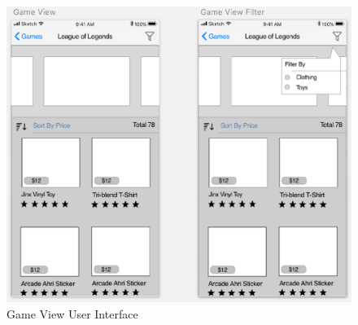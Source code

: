 \documentclass[onecolumn, draftclsnofoot,10pt, compsoc]{IEEEtran}
\begin{document}
\begin{figure}[H]
\centering
\captionsetup{justification=centering}
\includegraphics[scale=.50]{GameView}
\caption{Game View User Interface}
\captionsetup{justification=centering}
\end{figure}



\end{document}
